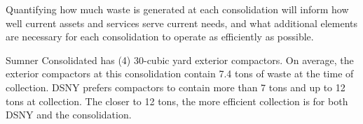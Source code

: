 
    Quantifying how much waste is generated at each consolidation will inform how well current assets and services serve current needs, and what additional elements are necessary for each consolidation to operate as efficiently as possible.
    
    Sumner Consolidated has (4) 30-cubic yard exterior compactors. On average, the exterior compactors at this consolidation contain 7.4 tons of waste at the time of collection. DSNY prefers compactors to contain more than 7 tons and up to 12 tons at collection. The closer to 12 tons, the more efficient collection is for both DSNY and the consolidation.